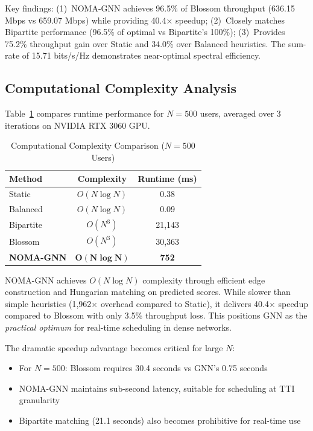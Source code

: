 Key findings: (1)~NOMA-GNN achieves 96.5\% of Blossom throughput (636.15 Mbps vs 659.07 Mbps) while providing 40.4× speedup; (2)~Closely matches Bipartite performance (96.5\% of optimal vs Bipartite's 100\%); (3)~Provides 75.2\% throughput gain over Static and 34.0\% over Balanced heuristics. The sum-rate of 15.71 bits/s/Hz demonstrates near-optimal spectral efficiency.

\subsection{Computational Complexity Analysis}

Table~\ref{tab:complexity} compares runtime performance for $N=500$ users, averaged over 3 iterations on NVIDIA RTX 3060 GPU.

\begin{table}[!t]
\centering
\caption{Computational Complexity Comparison ($N=500$ Users)}
\label{tab:complexity}
\begin{tabular}{l c c}
\toprule
\textbf{Method} & \textbf{Complexity} & \textbf{Runtime (ms)} \\
\midrule
Static & $O(N \log N)$ & 0.38 \\
Balanced & $O(N \log N)$ & 0.09 \\
Bipartite & $O(N^3)$ & 21,143 \\
Blossom & $O(N^3)$ & 30,363 \\
\textbf{NOMA-GNN} & $\boldsymbol{O(N \log N)}$ & \textbf{752} \\
\bottomrule
\end{tabular}
\end{table}

NOMA-GNN achieves $O(N \log N)$ complexity through efficient edge construction and Hungarian matching on predicted scores. While slower than simple heuristics (1,962× overhead compared to Static), it delivers 40.4× speedup compared to Blossom with only 3.5\% throughput loss. This positions GNN as the \emph{practical optimum} for real-time scheduling in dense networks.

The dramatic speedup advantage becomes critical for large $N$:
\begin{itemize}
    \item For $N=500$: Blossom requires 30.4 seconds vs GNN's 0.75 seconds
    \item NOMA-GNN maintains sub-second latency, suitable for scheduling at TTI granularity
    \item Bipartite matching (21.1 seconds) also becomes prohibitive for real-time use
\end{itemize}

